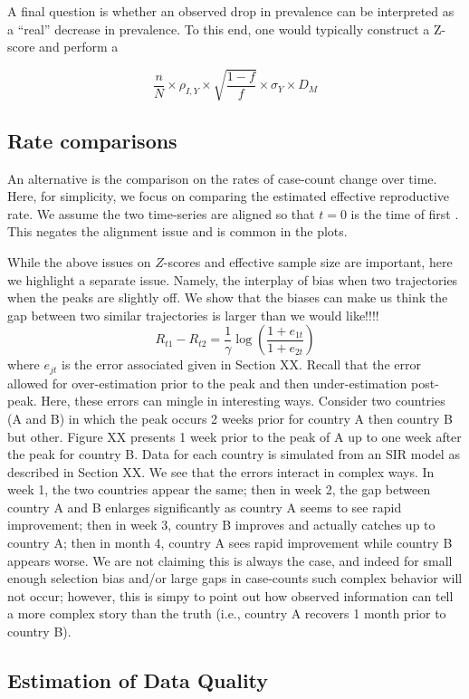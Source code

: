 \documentclass[11pt]{amsart}
\begin{document}
A final question is whether an observed drop in prevalence can be interpreted as a ``real'' decrease in prevalence.  To this end, one would typically construct a Z-score and perform a


$$
\frac{n}{N} \times \rho_{I,Y} \times \sqrt{\frac{1-f}{f}} \times \sigma_{Y} \times D_M
$$

\subsection{Rate comparisons}

An alternative is the comparison on the rates of case-count change over time.  Here, for simplicity, we focus on comparing the estimated effective reproductive rate.  We assume the two time-series are aligned so that $t=0$ is the time of first .  This negates the alignment issue and is common in the plots.

While the above issues on $Z$-scores and effective sample size are important, here we highlight a separate issue.  Namely, the interplay of bias when two trajectories when the peaks are slightly off.  We show that the biases can make us think the gap between two similar trajectories is larger than we would like!!!!
$$
R_{t1} - R_{t2} = \frac{1}{\gamma} \log \left( \frac{1 + e_{1t}}{1+e_{2t}} \right)
$$
where $e_{jt}$ is the error associated given in Section XX.  Recall that the error allowed for over-estimation prior to the peak and then under-estimation post-peak.  Here, these errors can mingle in interesting ways.  Consider two countries (A and B) in which the peak occurs 2 weeks prior for country A then country B but other.  Figure XX presents 1 week prior to the peak of A up to one week after the peak for country B.  Data for each country is simulated from an SIR model as described in Section XX.  We see that the errors interact in complex ways.  In week 1, the two countries appear the same; then in week 2, the gap between country A and B enlarges significantly as country A seems to see rapid improvement; then in week 3, country B improves and actually catches up to country A; then in month 4, country A sees rapid improvement while country B appears worse.  We are not claiming this is always the case, and indeed for small enough selection bias and/or large gaps in case-counts such complex behavior will not occur; however, this is simpy to point out how observed information can tell a more complex story than the truth (i.e., country A recovers 1 month prior to country B).

\subsection{Estimation of Data Quality}
\end{document}
